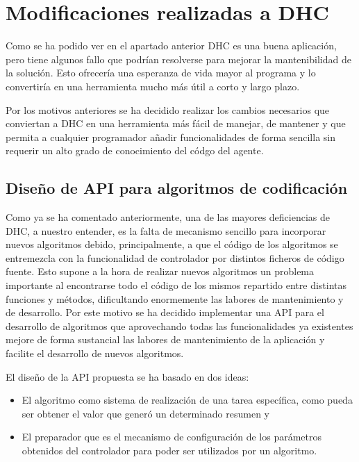 \section{Modificaciones realizadas a DHC}

Como se ha podido ver en el apartado anterior DHC es una buena aplicación, pero tiene algunos fallo que podrían resolverse para mejorar la mantenibilidad de la solución. Esto ofrecería una esperanza de vida mayor al programa y lo convertiría en una herramienta mucho más útil a corto y largo plazo.

Por los motivos anteriores se ha decidido realizar los cambios necesarios que conviertan a DHC en una herramienta más fácil de manejar, de mantener y que permita a cualquier programador añadir funcionalidades de forma sencilla sin requerir un alto grado de conocimiento del códgo del agente.

\subsection{Diseño de API para algoritmos de codificación}

Como ya se ha comentado anteriormente, una de las mayores deficiencias de DHC, a nuestro entender, es la falta de mecanismo sencillo para incorporar nuevos algoritmos debido, principalmente, a que el código de los algoritmos se entremezcla con la funcionalidad de controlador por distintos ficheros de código fuente. Esto supone a la hora de realizar nuevos algoritmos un problema importante al encontrarse todo el código de los mismos repartido entre distintas funciones y métodos, dificultando enormemente las labores de mantenimiento y de desarrollo. Por este motivo se ha decidido implementar una API para el desarrollo de algoritmos que aprovechando todas las funcionalidades ya existentes mejore de forma sustancial las labores de mantenimiento de la aplicación y facilite el desarrollo de nuevos algoritmos.

El diseño de la API propuesta se ha basado en dos ideas:
\begin{itemize}
	\item El algoritmo como sistema de realización de una tarea específica, como pueda ser obtener el valor que generó un determinado resumen y
	
	\item El preparador que es el mecanismo de configuración de los parámetros obtenidos del controlador para poder ser utilizados por un algoritmo.
\end{itemize}

